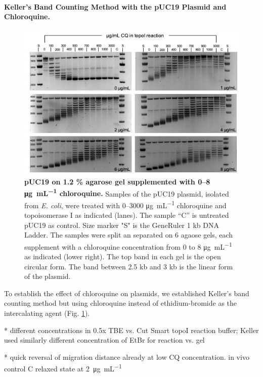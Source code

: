\documentclass[10pt,letterpaper]{article}
\newcommand{\ugml}{\micro\gram\per\milli\liter}
\begin{document}
\paragraph{Keller's Band Counting Method with the pUC19 Plasmid and Chloroquine.}

\begin{figure}[ht!]
    \includegraphics[width=\textwidth]{figures/keller_puc19.jpg}
  \caption{\textbf{pUC19 on 1.2 \% agarose gel supplemented with 0--8
      \si{\ugml} chloroquine.} Samples of the pUC19 plasmid, isolated
    from \textit{E. coli}, were treated with 0--3000 \si{\ugml}
    chloroquine and topoisomerase I as indicated (lanes). The sample
    “C” is untreated pUC19 as control. Size marker "S" is the
    GeneRuler 1 kb DNA Ladder. The samples were split an separated on
    6 agaose gels, each supplement with a chloroquine concentration
    from 0 to 8 \si{\ugml} as indicated (lower right). The top band
    in each gel is the open circular form. The band between  2.5 kb and 3 kb
    is the linear form of the plasmid.}
  \label{fig:keller} 
\end{figure}

To establish the effect of chloroquine on plasmids, we established
Keller's band counting method \cite{Keller1975b} but using chloroquine
instead of ethidium-bromide as the intercalating agent
(Fig. \ref{fig:keller}).

* different concentrations in 0.5x TBE vs. Cut Smart topoI reaction
buffer; Keller used similarly different concentration of EtBr for
reaction vs. gel

* quick reversal of migration distance already at low CQ
concentration. in vivo control C  relaxed state at \SI{2}{\ugml}
\end{document}
